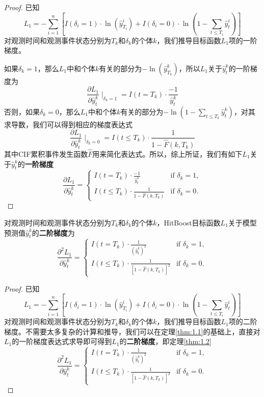\begin{proof}
已知$$L_1 = -\sum_{i=1}^{n} \left[ I(\delta_i=1)\cdot \ln(\hat{y}_{T_i}^i) + I(\delta_i=0)\cdot \ln(1-\sum_{t\le T_i}\hat{y}_t^i) \right]$$ 对观测时间和观测事件状态分别为$T_k$和$\delta_k$的个体$k$，我们推导目标函数$L_1$项的一阶梯度。

如果$\delta_k = 1$，那么$L_1$中和个体$k$有关的部分为$-\ln(\hat{y}_{T_k}^k)$，所以$L_1$关于$\hat{y}_t^k$的一阶梯度为$$\frac{\partial L_1}{\partial \hat{y}_t^k} \mid_{\delta_k = 1} = I(t=T_k)\cdot \frac{-1}{\hat{y}_t^k}$$ 否则，如果$\delta_k = 0$，那么$L_1$中和个体$k$有关的部分为$-\ln(1-\sum_{t\le T_k}\hat{y}_t^k)$，对其求导数，我们可以得到相应的梯度表达式$$\frac{\partial L_1}{\partial \hat{y}_t^k} \mid_{\delta_k = 0} = I(t\le T_k)\cdot \frac{1}{1-\hat{F}(k, T_k)}$$ 其中CIF累积事件发生函数$\hat{F}$用来简化表达式。所以，综上所证，我们有如下$L_1$关于$\hat{y}_t^k$的\textbf{一阶梯度}$$
\frac{\partial L_1}{\partial \hat{y}_t^k}=
\begin{cases}
  I(t=T_k)\cdot \frac{-1}{\hat{y}_t^k} & \text{if } \delta_k = 1,\\
  I(t\le T_k)\cdot \frac{1}{1-\hat{F}(k, T_k)} & \text{if } \delta_k = 0.
\end{cases}
$$
\end{proof}

\begin{theorem}\label{thm:1.2}
对观测时间和观测事件状态分别为$T_k$和$\delta_k$的个体$k$，HitBoost目标函数$L_1$关于模型预测值$\hat{y}_t^k$的\textbf{二阶梯度}为$$
\frac{\partial^2 L_1}{\partial \hat{y}_t^k}=
\begin{cases}
I(t=T_k)\cdot \frac{1}{{(\hat{y}_t^k)}^2} & \text{if } \delta_k = 1,\\
I(t\le T_k)\cdot \frac{1}{{[1-\hat{F}(k, T_k)]}^2} & \text{if } \delta_k = 0.
\end{cases}
$$
\end{theorem}

\begin{proof}
已知$$L_1 = -\sum_{i=1}^{n} \left[ I(\delta_i=1)\cdot \ln(\hat{y}_{T_i}^i) + I(\delta_i=0)\cdot \ln(1-\sum_{t\le T_i}\hat{y}_t^i) \right]$$ 对观测时间和观测事件状态分别为$T_k$和$\delta_k$的个体$k$，我们推导目标函数$L_1$项的二阶梯度。不需要太多复杂的计算和推导，我们可以在定理\ref{thm:1.1}的基础上，直接对$L_1$的一阶梯度表达式求导即可得到$L_1$的\textbf{二阶梯度}，即定理\ref{thm:1.2}$$
\frac{\partial^2 L_1}{\partial \hat{y}_t^k}=
\begin{cases}
  I(t=T_k)\cdot \frac{1}{{(\hat{y}_t^k)}^2} & \text{if } \delta_k = 1,\\
  I(t\le T_k)\cdot \frac{1}{{[1-\hat{F}(k, T_k)]}^2} & \text{if } \delta_k = 0.
\end{cases}
$$
\end{proof}


